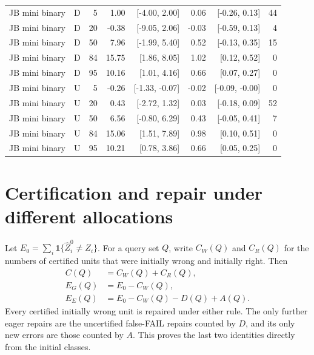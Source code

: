 \begin{table}[!ht]
\begin{tabular}{llrrrrrr}
JB mini binary & D & 5 & 1.00 & [-4.00, 2.00] & 0.06 & [-0.26, 0.13] & 44 \\
JB mini binary & D & 20 & -0.38 & [-9.05, 2.06] & -0.03 & [-0.59, 0.13] & 4 \\
JB mini binary & D & 50 & 7.96 & [-1.99, 5.40] & 0.52 & [-0.13, 0.35] & 15 \\
JB mini binary & D & 84 & 15.75 & [1.86, 8.05] & 1.02 & [0.12, 0.52] & 0 \\
JB mini binary & D & 95 & 10.16 & [1.01, 4.16] & 0.66 & [0.07, 0.27] & 0 \\
JB mini binary & U & 5 & -0.26 & [-1.33, -0.07] & -0.02 & [-0.09, -0.00] & 0 \\
JB mini binary & U & 20 & 0.43 & [-2.72, 1.32] & 0.03 & [-0.18, 0.09] & 52 \\
JB mini binary & U & 50 & 6.56 & [-0.80, 6.29] & 0.43 & [-0.05, 0.41] & 7 \\
JB mini binary & U & 84 & 15.06 & [1.51, 7.89] & 0.98 & [0.10, 0.51] & 0 \\
JB mini binary & U & 95 & 10.21 & [0.78, 3.86] & 0.66 & [0.05, 0.25] & 0 \\
\bottomrule
\end{tabular}
\end{table}
\clearpage

\section{Certification and repair under different allocations}
\label{app:allocation}

Let $E_0=\sum_i\mathbf1\{\widehat Z_i^0\ne Z_i\}$. For a query set $Q$,
write $C_W(Q)$ and $C_R(Q)$ for the numbers of certified units that were
initially wrong and initially right. Then
\begin{align}
 C(Q)&=C_W(Q)+C_R(Q),\\
 E_G(Q)&=E_0-C_W(Q),\\
 E_E(Q)&=E_0-C_W(Q)-D(Q)+A(Q).
 \label{app:eq:allocation-identity}
\end{align}
Every certified initially wrong unit is repaired under either rule. The
only further eager repairs are the uncertified false-FAIL repairs counted
by $D$, and its only new errors are those counted by $A$. This proves the
last two identities directly from the initial classes.

